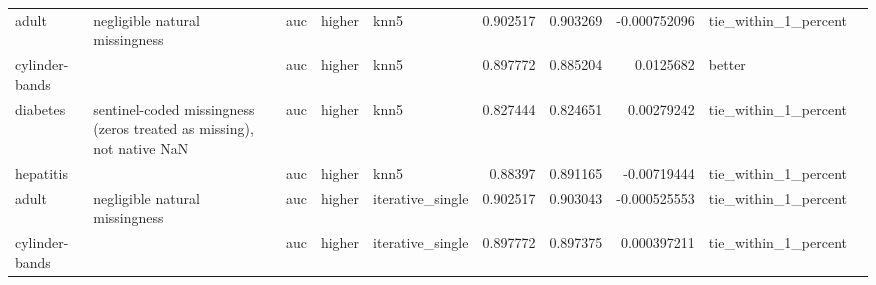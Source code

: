 \begin{table}[ht]
{\begin{tabular}{lllllrrrll}
 adult          & negligible natural missingness                                        & auc                            & higher             & knn5             &                   0.902517 &               0.903269 &                    -0.000752096 & tie\_within\_1\_percent &                                                                                                                    \\
 cylinder-bands &                                                                       & auc                            & higher             & knn5             &                   0.897772 &               0.885204 &                     0.0125682   & better               &                                                                                                                    \\
 diabetes       & sentinel-coded missingness (zeros treated as missing), not native NaN & auc                            & higher             & knn5             &                   0.827444 &               0.824651 &                     0.00279242  & tie\_within\_1\_percent &                                                                                                                    \\
 hepatitis      &                                                                       & auc                            & higher             & knn5             &                   0.88397  &               0.891165 &                    -0.00719444  & tie\_within\_1\_percent &                                                                                                                    \\
 adult          & negligible natural missingness                                        & auc                            & higher             & iterative\_single &                   0.902517 &               0.903043 &                    -0.000525553 & tie\_within\_1\_percent &                                                                                                                    \\
 cylinder-bands &                                                                       & auc                            & higher             & iterative\_single &                   0.897772 &               0.897375 &                     0.000397211 & tie\_within\_1\_percent &                                                                                                                    \\

\end{tabular}}
\end{table}

